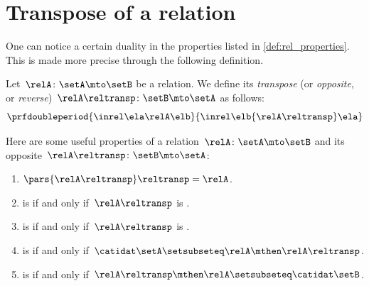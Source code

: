 
\section{Transpose of a relation}

One can notice a certain duality in the properties listed in \cref{def:rel_properties}.
This is made more precise through the following definition.

\begin{ctdefinition}
    \label{def:relation-transpose}
    Let~$\relA\colon \setA\mto \setB$ be a relation.
    We define its \emph{transpose} (or \emph{opposite}, or \emph{reverse})~$\relA\reltransp\colon \setB \mto \setA$ as follows:
    \begin{equation}
        \prfdoubleperiod{
            \inrel \ela \relA \elb
        }{
            \inrel \elb {\relA\reltransp} \ela
        }
    \end{equation}
\end{ctdefinition}
\begin{remark}
    \label{re:rel-op-properties}
    Here are some useful properties of a relation~$\relA\colon \setA \mto \setB$ and its opposite~$\relA\reltransp\colon \setB \mto \setA$:
    \begin{enumerate}
        \item $\pars{\relA\reltransp} \reltransp = \relA $.
        \item \relA is  if and only if~$\relA\reltransp$ is .
        \item \relA is  if and only if~$\relA\reltransp$ is .
        \item \relA is  if and only if~$\catidat\setA\setsubseteq \relA \mthen \relA\reltransp$.
        \item \relA is  if and only if~$\relA\reltransp\mthen \relA\setsubseteq \catidat\setB$.
    \end{enumerate}
\end{remark}

\begin{marginfigure}
    \centering
    \caption{}
    \label{fig:rel_transpose}
\end{marginfigure}

